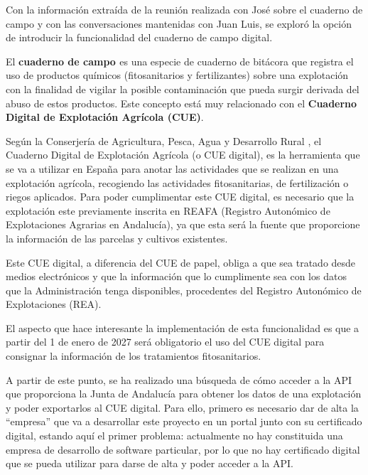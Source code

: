 \begin{itemize}
\begin{itemize}
        Con la información extraída de la reunión realizada con José sobre el cuaderno de campo y con las conversaciones
        mantenidas con Juan Luis, se exploró la opción de introducir la funcionalidad del cuaderno de campo digital. 
        
        El \textbf{cuaderno de campo \cite{cuadernoCampo}} es una especie de cuaderno de bitácora que registra el uso 
        de productos químicos (fitosanitarios y fertilizantes) sobre una explotación con la finalidad de vigilar la 
        posible contaminación que pueda surgir derivada del abuso de estos productos. Este concepto está muy relacionado
        con el \textbf{Cuaderno Digital de Explotación Agrícola (CUE)}.

        Según la Conserjería de Agricultura, Pesca, Agua y Desarrollo Rural \cite{cueDigital}, el Cuaderno Digital de 
        Explotación Agrícola (o CUE digital), es la herramienta que se va a utilizar en España para anotar las 
        actividades que se realizan en una explotación agrícola, recogiendo las actividades fitosanitarias, de 
        fertilización o riegos aplicados. Para poder cumplimentar este CUE digital, es necesario que la explotación este
        previamente inscrita en REAFA (Registro Autonómico de Explotaciones Agrarias en Andalucía), ya que esta será la 
        fuente que proporcione la información de las parcelas y cultivos existentes.

        Este CUE digital, a diferencia del CUE de papel, obliga a que sea tratado desde medios electrónicos y que la
        información que lo cumplimente sea con los datos que la Administración tenga disponibles, procedentes del 
        Registro Autonómico de Explotaciones (REA).

        El aspecto que hace interesante la implementación de esta funcionalidad es que a partir del 1 de enero de 2027
        será obligatorio el uso del CUE digital para consignar la información de los tratamientos fitosanitarios. 
        
        A partir de este punto, se ha realizado una búsqueda de cómo acceder a la API que proporciona la Junta de 
        Andalucía para obtener los datos de una explotación y poder exportarlos al CUE digital. Para ello, primero es
        necesario dar de alta la ``empresa'' que va a desarrollar este proyecto en un portal junto con su certificado
        digital, estando aquí el primer problema: actualmente no hay constituida una empresa de desarrollo de software 
        particular, por lo que no hay certificado digital que se pueda utilizar para darse de alta y poder acceder a la
        API.


\end{itemize}
\end{itemize}
